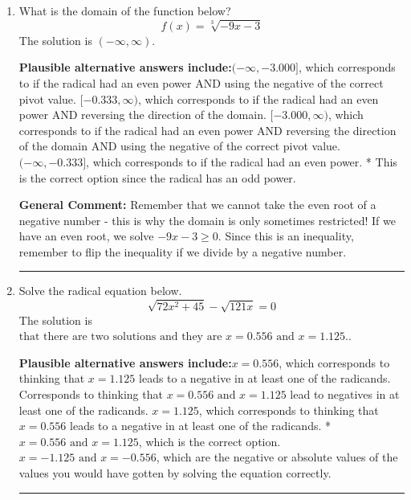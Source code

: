 \documentclass{extbook}[14pt]
\newcommand{\litem}[1]{\item #1

\rule{\textwidth}{0.4pt}}
\begin{document}
\begin{enumerate}\litem{
What is the domain of the function below?
\[ f(x) = \sqrt[3]{-9 x - 3} \]The solution is \( (-\infty, \infty) \).\begin{enumerate}[label=\Alph*.]
\textbf{Plausible alternative answers include:}$(-\infty, -3.000]$, which corresponds to if the radical had an even power AND using the negative of the correct pivot value.
$[-0.333, \infty)$, which corresponds to if the radical had an even power AND reversing the direction of the domain.
$[-3.000, \infty)$, which corresponds to if the radical had an even power AND reversing the direction of the domain AND using the negative of the correct pivot value.
$(-\infty, -0.333]$, which corresponds to if the radical had an even power.
* This is the correct option since the radical has an odd power.
\end{enumerate}

\textbf{General Comment:} Remember that we cannot take the even root of a negative number - this is why the domain is only sometimes restricted! If we have an even root, we solve $-9 x - 3 \geq 0$. Since this is an inequality, remember to flip the inequality if we divide by a negative number.
}
\litem{
Solve the radical equation below.
\[ \sqrt{72 x^2 + 45} - \sqrt{121 x} = 0 \]The solution is \( \text{that there are two solutions and they are } x = 0.556 \text{ and } x = 1.125. \).\begin{enumerate}[label=\Alph*.]
\textbf{Plausible alternative answers include:}$x = 0.556$, which corresponds to thinking that $x = 1.125$ leads to a negative in at least one of the radicands.
Corresponds to thinking that $x = 0.556 \text{ and } x = 1.125$ lead to negatives in at least one of the radicands.
$x = 1.125$, which corresponds to thinking that $x = 0.556$ leads to a negative in at least one of the radicands.
* $x = 0.556 \text{ and } x = 1.125$, which is the correct option.
$x = -1.125 \text{ and } x = -0.556$, which are the negative or absolute values of the values you would have gotten by solving the equation correctly.
\end{enumerate}

}
\end{enumerate}
\end{document}
